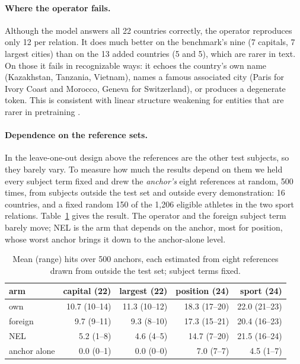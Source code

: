 \documentclass{article}
\begin{document}
\paragraph{Where the operator fails.} Although the model answers all 22
countries correctly, the operator reproduces only 12 per relation. It
does much better on the benchmark's nine (7 capitals, 7 largest cities)
than on the 13 added countries (5 and 5), which are rarer in text. On
those it fails in recognizable ways: it echoes the country's own name
(Kazakhstan, Tanzania, Vietnam), names a famous associated city (Paris
for Ivory Coast and Morocco, Geneva for Switzerland), or produces a
degenerate token. This is consistent with linear structure weakening for
entities that are rarer in pretraining \citep{merullo2025linear}.

\paragraph{Dependence on the reference sets.} In the leave-one-out
design above the references are the other test subjects, so they barely
vary. To measure how much the results depend on them we held every
subject term fixed and drew the \emph{anchor's} eight references at
random, 500 times, from subjects outside the test set and outside every
demonstration: 16 countries, and a fixed random 150 of the 1{,}206
eligible athletes in the two sport relations. Table~\ref{tab:swapanchor} gives
the result. The operator and the foreign subject term barely move; NEL
is the arm that depends on the anchor, most for position, whose worst
anchor brings it down to the anchor-alone level.

\begin{table}[h]
\centering
\small
\begin{tabular}{lrrrr}
\toprule
arm & capital (22) & largest (22) & position (24) & sport (24) \\
\midrule
own & 10.7 (10--14) & 11.3 (10--12) & 18.3 (17--20) & 22.0 (21--23) \\
foreign & 9.7 (9--11) & 9.3 (8--10) & 17.3 (15--21) & 20.4 (16--23) \\
NEL & 5.2 (1--8) & 4.6 (4--5) & 14.7 (7--20) & 21.5 (16--24) \\
anchor alone & 0.0 (0--1) & 0.0 (0--0) & 7.0 (7--7) & 4.5 (1--7) \\
\bottomrule
\end{tabular}
\caption{Mean (range) hits over 500 anchors, each estimated from eight
references drawn from outside the test set; subject terms fixed.}
\label{tab:swapanchor}
\end{table}
\end{document}
